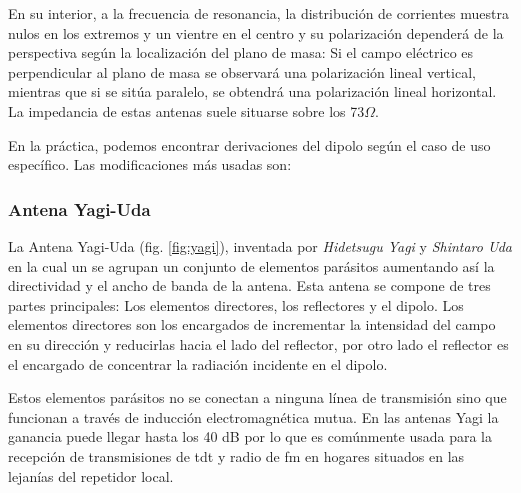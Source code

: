 \par En su interior, a la frecuencia de resonancia, la distribución de corrientes muestra nulos en los extremos y un vientre en el centro y su polarización dependerá de la perspectiva según la localización del plano de masa: Si el campo eléctrico es perpendicular al plano de masa se observará una polarización lineal vertical, mientras que si se sitúa paralelo, se obtendrá una polarización lineal horizontal. La impedancia de estas antenas suele situarse sobre los 73$\Omega$.
\\
\par En la práctica, podemos encontrar derivaciones del dipolo según el caso de uso específico. Las modificaciones más usadas son:

\subsubsection{Antena Yagi-Uda}

La Antena Yagi-Uda (fig. \ref{fig:yagi}), inventada por \textit{Hidetsugu Yagi} y \textit{Shintaro Uda} en la cual un se agrupan un conjunto de elementos parásitos aumentando así la directividad y el ancho de banda de la antena. Esta antena se compone de tres partes principales: Los elementos directores, los reflectores y el dipolo. Los elementos directores son los encargados de incrementar la intensidad del campo en su dirección y reducirlas hacia el lado del reflector, por otro lado el reflector es el encargado de concentrar la radiación incidente en el dipolo. 
\\
\par Estos elementos parásitos no se conectan a  ninguna línea de transmisión sino que funcionan a través de inducción electromagnética mutua. En las antenas Yagi la ganancia puede llegar hasta los 40 dB por lo que es comúnmente usada para la recepción de transmisiones de \gls{tdt} y radio de \gls{fm} en hogares situados en las lejanías del repetidor local.



